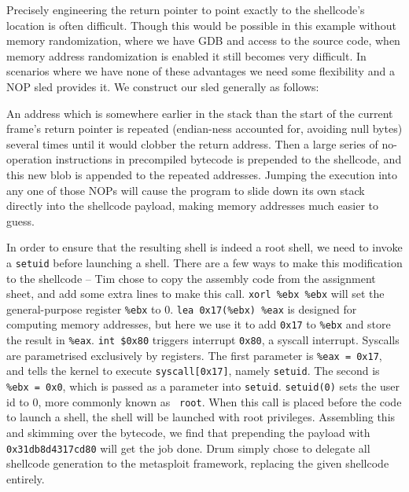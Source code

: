 Precisely engineering the return pointer to point exactly to the shellcode's location is often difficult. Though this
would be possible in this example without memory randomization, where we have GDB and access to the source code, when
memory address randomization is enabled it still becomes very difficult. In scenarios where we have none of these
advantages we need some flexibility and a NOP sled provides it. We construct our sled generally as follows:

An address which is somewhere earlier in the stack than the start of the current frame's return pointer is repeated
(endian-ness accounted for, avoiding null bytes) several times until it would clobber the return address. Then a large
series of no-operation instructions in precompiled bytecode is prepended to the shellcode, and this new blob is appended
to the repeated addresses. Jumping the execution into any one of those NOPs will cause the program to slide down its own
stack directly into the shellcode payload, making memory addresses much easier to guess.

In order to ensure that the resulting shell is indeed a root shell, we need to invoke a {\tt setuid} before launching a
shell. There are a few ways to make this modification to the shellcode -- Tim chose to copy the assembly code from the
assignment sheet, and add some extra lines to make this call. {\tt xorl \%ebx \%ebx} will set the general-purpose
register {\tt \%ebx} to 0. {\tt lea 0x17(\%ebx) \%eax} is designed for computing memory addresses, but here we use it to
add {\tt 0x17} to {\tt \%ebx} and store the result in {\tt \%eax}. {\tt int \$0x80} triggers interrupt {\tt 0x80}, a
syscall interrupt. Syscalls are parametrised exclusively by registers\cite{syscalls}. The first parameter is {\tt \%eax
= 0x17}, and tells the kernel to execute {\tt syscall[0x17]}, namely {\tt setuid}. The second is {\tt \%ebx = 0x0},
which is passed as a parameter into {\tt setuid}. {\tt setuid(0)} sets the user id to 0, more commonly known as {\tt
root}. When this call is placed before the code to launch a shell, the shell will be launched with root privileges.
Assembling this and skimming over the bytecode, we find that prepending the payload with {\tt 0x31db8d4317cd80} will get
the job done. Drum simply chose to delegate all shellcode generation to the metasploit framework, replacing the given
shellcode entirely.
